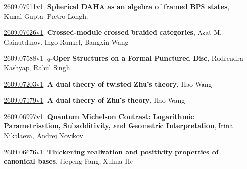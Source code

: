 \documentclass[9pt, a4paper]{article}
\theoremstyle{plain}
\theoremstyle{definition}
\theoremstyle{remark}
\newcommand{\arxiv}[3]{\href{https://arxiv.org/abs/#1}{#1}, \textbf{\textcolor{arxivblue}{#2}}, #3}
\begin{document}
\arxiv{2609.07911v1}{Spherical DAHA as an algebra of framed BPS states}{Kunal Gupta, Pietro Longhi}

\arxiv{2609.07626v1}{Crossed-module crossed braided categories}{Azat M. Gainutdinov, Ingo Runkel, Bangxin Wang}

\arxiv{2609.07588v1}{$q$-Oper Structures on a Formal Punctured Disc}{Rudrendra Kashyap, Rahul Singh}

\arxiv{2609.07203v1}{A dual theory of twisted Zhu's theory}{Hao Wang}

\arxiv{2609.07179v1}{A dual theory of Zhu's theory}{Hao Wang}

\arxiv{2609.06997v1}{Quantum Michelson Contrast: Logarithmic Parametrisation, Subadditivity, and Geometric Interpretation}{Irina Nikolaeva, Andrej Novikov}

\arxiv{2609.06676v1}{Thickening realization and positivity properties of canonical bases}{Jiepeng Fang, Xuhua He}

\end{document}
